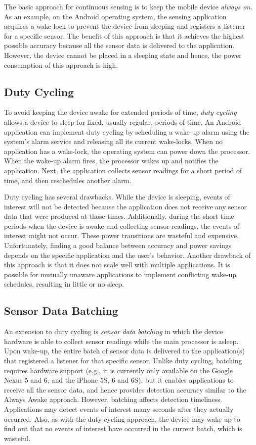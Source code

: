 The basic approach for continuous sensing is to keep the mobile device
\emph{always on}.  As an example, on the Android operating system, the
sensing application acquires a wake-lock to prevent the device from
sleeping and registers a listener for a specific sensor.  The benefit
of this approach is that it achieves the highest possible accuracy
because all the sensor data is delivered to the application.  However,
the device cannot be placed in a sleeping state and hence, the power
consumption of this approach is high.

\subsection{Duty Cycling}

To avoid keeping the device awake for extended periods of time,
\emph{duty cycling} allows a device to sleep for fixed, usually
regular, periods of time.  An Android application can implement
duty cycling by scheduling a wake-up alarm using the system's alarm
service and releasing all its current wake-locks.  When no
application has a wake-lock, the operating system can power down the
processor.  When the wake-up alarm fires, the processor wakes up and
notifies the application.  Next, the application collects sensor
readings for a short period of time, and then reschedules another
alarm.

Duty cycling has several drawbacks.  While the device is sleeping,
events of interest will not be detected because the application does
not receive any sensor data that were produced at those times.
Additionally, during the short time periods when the device is awake
and collecting sensor readings, the events of interest might not
occur.  These power transitions are wasteful and expensive.
Unfortunately, finding a good balance between accuracy and power
savings depends on the specific application and the user's behavior.
Another drawback of this approach is that it does not scale well with
multiple applications.  It is possible for mutually unaware
applications to implement conflicting wake-up schedules, resulting in
little or no sleep.

\subsection{Sensor Data Batching}

An extension to duty cycling is \emph{sensor data batching} in which
the device hardware is able to collect sensor readings while the main
processor is asleep.  Upon wake-up, the entire batch of sensor data is
delivered to the application(s) that registered a listener for that
specific sensor.  Unlike duty cycling, batching requires hardware
support (e.g., it is currently only available on the 
Google Nexus 5 and 6, and the iPhone 5S, 6 and 6S), 
but it enables applications to
receive all the sensor data, and hence provides detection accuracy
similar to the Always Awake approach.  However, batching affects
detection timeliness.  Applications may detect events of interest many
seconds after they actually occurred.  Also, as with the duty cycling
approach, the device may wake up to find out that no events of
interest have occurred in the current batch, which is wasteful.

